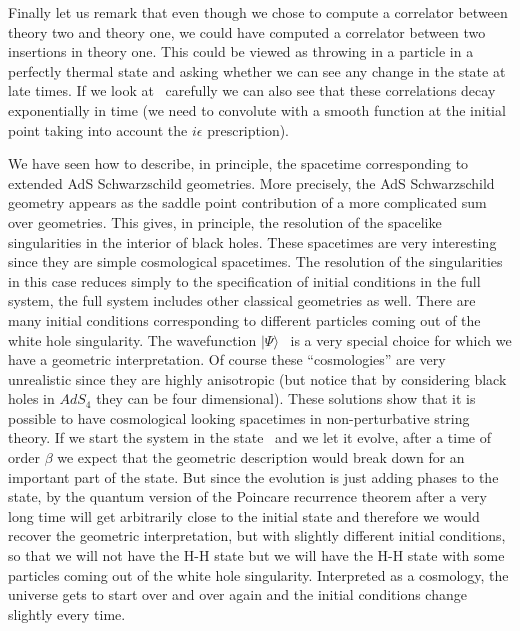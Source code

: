 Finally let us remark that even though we chose to compute a
correlator between theory two and theory one, we could have computed
a correlator between two insertions in theory one. This could be 
viewed as throwing in a particle in a perfectly thermal state and asking
whether we can see any change in the state at late times. 
If we look at \same\ carefully we can also see that these correlations
decay exponentially in time (we need to convolute  with a smooth 
function at the initial point taking into account the $i\epsilon$
 prescription). 







We have seen how to describe, in principle, the spacetime 
corresponding to extended AdS Schwarzschild geometries. 
More precisely, the AdS Schwarzschild geometry appears as 
the saddle point contribution of a more complicated sum over
geometries. 
This gives, in principle, the resolution of the spacelike 
singularities in the interior of black holes. 
These spacetimes are very interesting since they are simple
cosmological spacetimes. The resolution of the singularities in
this case reduces simply to the specification of initial conditions
in the full system, the full system includes other classical geometries
as well.  There are many initial conditions
corresponding to different particles coming out of the 
white hole singularity. The wavefunction $|\Psi\rangle$ \wavefunction\ 
is a very 
special choice for which we have a geometric interpretation. 
Of course these ``cosmologies'' are very unrealistic since they are
highly anisotropic (but notice that by considering black holes in 
$AdS_4$ they can be 
four dimensional).  These solutions show that it is 
possible to have cosmological looking spacetimes in non-perturbative
string theory. 
If we start the system in the state \wavefunction\ and we let it evolve,
after a time of order 
 $\beta$ we expect that the geometric description would 
break down for an important part of the state.
 But since the evolution is just adding 
phases to the state, by the quantum version of the Poincare recurrence 
theorem  after a very long time
 will  get arbitrarily close to the initial state and therefore we would
recover the geometric interpretation, but with slightly different 
initial conditions, so that we will not have the H-H state but we will have
the H-H state with some particles coming out of the white hole singularity. 
 Interpreted as a cosmology, the universe gets
to start over and over again and the initial conditions 
change slightly every time. 

